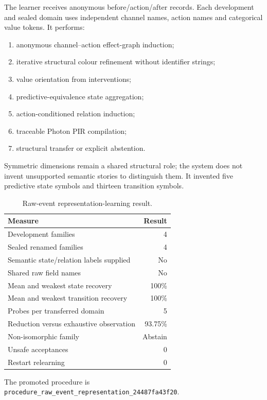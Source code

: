 The learner receives anonymous before/action/after records.  Each development
and sealed domain uses independent channel names, action names and categorical
value tokens.  It performs:
\begin{enumerate}
  \item anonymous channel--action effect-graph induction;
  \item iterative structural colour refinement without identifier strings;
  \item value orientation from interventions;
  \item predictive-equivalence state aggregation;
  \item action-conditioned relation induction;
  \item traceable Photon PIR compilation;
  \item structural transfer or explicit abstention.
\end{enumerate}

Symmetric dimensions remain a shared structural role; the system does not
invent unsupported semantic stories to distinguish them.  It invented five
predictive state symbols and thirteen transition symbols.

\begin{table}[ht]
\centering
\begin{tabular}{lr}
\toprule
Measure & Result \\
\midrule
Development families & 4 \\
Sealed renamed families & 4 \\
Semantic state/relation labels supplied & No \\
Shared raw field names & No \\
Mean and weakest state recovery & 100\% \\
Mean and weakest transition recovery & 100\% \\
Probes per transferred domain & 5 \\
Reduction versus exhaustive observation & 93.75\% \\
Non-isomorphic family & Abstain \\
Unsafe acceptances & 0 \\
Restart relearning & 0 \\
\bottomrule
\end{tabular}
\caption{Raw-event representation-learning result.}
\end{table}

The promoted procedure is
\texttt{procedure\_raw\_event\_representation\_24487fa43f20}.

